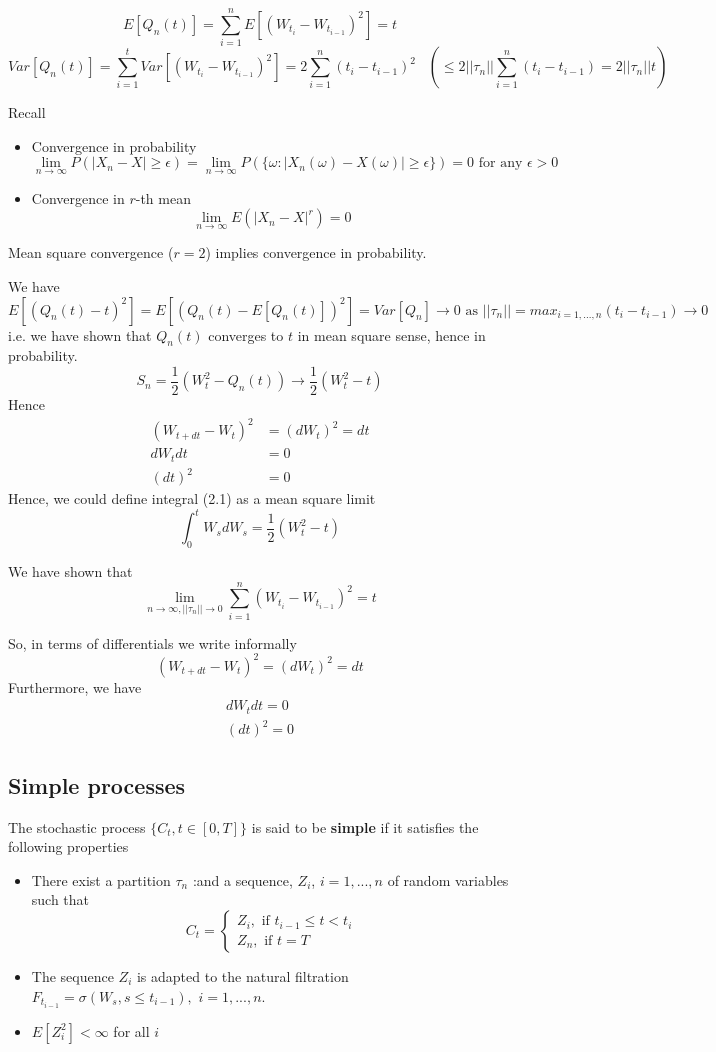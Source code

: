 \documentclass[11pt,a4paper]{book}
\theoremstyle{definition}\newtheorem{definition}{Definition}
\theoremstyle{definition}\newtheorem{fact}{Fact}
\theoremstyle{definition}\newtheorem{remark}{Remark}
\theoremstyle{definition}\newtheorem{ex}{Ex.}
\theoremstyle{definition}\newtheorem{project}{Project}
\theoremstyle{definition}\newtheorem{problem}{Problem}
\theoremstyle{definition}\newtheorem{example}{Example}
\numberwithin{theorem}{section}
\numberwithin{corollary}{chapter}
\numberwithin{assumption}{chapter}
\numberwithin{definition}{chapter}
\numberwithin{prop}{chapter}
\numberwithin{notation}{chapter}
\numberwithin{problem}{chapter}
\numberwithin{example}{chapter}
\numberwithin{fact}{chapter}
\numberwithin{ex}{chapter}
\begin{document}
$$E[Q_n(t)] = \sum_{i=1}^n E[(W_{t_i} - W_{t_{i-1}})^2] = t$$
$$Var[Q_n(t)] = \sum_{i=1}^t Var[(W_{t_i} - W_{t_{i-1}})^2] = 2 \sum_{i=1}^n (t_i - t_{i-1})^2 \,\,\,\,\,(\leq 2 ||\tau_n|| \sum_{i=1}^n (t_i - t_{i-1}) = 2||\tau_n||t ) $$

Recall
\begin{itemize}
\item Convergence in probability
$$ \lim_{n \rightarrow \infty} P(|X_n - X| \geq \epsilon) = \lim_{n \rightarrow \infty} P(\{\omega:|X_n(\omega) - X(\omega)| \geq \epsilon\}) = 0 \text{  for any } \epsilon > 0 $$
\item Convergence in $r$-th mean
$$ \lim_{n \rightarrow \infty} E(|X_n - X|^r) = 0 $$
\end{itemize}
Mean square convergence ($r = 2$) implies convergence in probability.

We have
$$ E[(Q_n(t) - t)^2] = E[(Q_n(t)- E[Q_n(t)])^2] = Var[Q_n] \rightarrow 0 \text{  as  } ||\tau_n|| = max_{i=1,...,n}(t_i - t_{i-1}) \rightarrow 0 $$
i.e. we have shown that $Q_n(t)$ converges to $t$ in mean square sense, hence in probability.
$$ S_n = \frac{1}{2}(W_t^2 - Q_n(t)) \rightarrow \frac{1}{2}(W_t^2 - t) $$
Hence
\begin{align*}
(W_{t+dt}-W_t)^2 &= (dW_t)^2 = dt \\
dW_t dt &= 0 \\
(dt)^2 &= 0
\end{align*}
Hence, we could define integral (2.1) as a mean square limit
$$ \int_0^t W_s dW_s = \frac{1}{2}(W_t^2 - t) $$

We have shown that
$$ \lim_{n \rightarrow \infty, ||\tau_n|| \rightarrow 0} \sum_{i=1}^n (W_{t_i} - W_{t_{i-1}})^2 = t $$

So, in terms of differentials we write informally
\begin{equation}
(W_{t+dt} - W_t)^2 = (dW_t)^2 = dt
\end{equation}
Furthermore, we have
\begin{align}
dW_t dt = 0 \nonumber \\
(dt)^2 = 0
\end{align}

\subsection{Simple processes}
The stochastic process $\{C_t, t\in [0, T]\}$ is said to be \textbf{simple} if it satisfies the following properties
\begin{itemize}
\item There exist a partition $\tau_n$ :and a sequence, $Z_i$, $i = 1,...,n$ of random variables such that
$$ C_t = \begin{cases}
Z_i, \text{     if } t_{i-1} \leq t < t_i \\
Z_n, \text{     if } t = T
\end{cases} $$
\item The sequence $Z_i$ is adapted to the natural filtration $F_{t_{i-1}} = \sigma (W_s, s \leq t_{i-1} ), \,\, i = 1, ... , n$.
\item $E[Z_i^2] < \infty$ for all $i$
\end{itemize}
\end{document}

